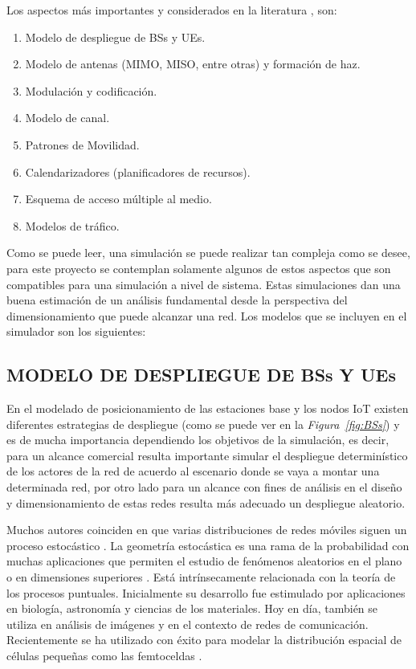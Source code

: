Los aspectos más importantes y considerados en la literatura \parencite{WirelessSim}, son:

\begin{enumerate}
    \item  Modelo de despliegue de BSs y UEs.
    \item  Modelo de antenas (MIMO, MISO, entre otras) y formación de haz.
    \item  Modulación y codificación.
    \item  Modelo de canal.
    \item  Patrones de Movilidad.
    \item  Calendarizadores (planificadores de recursos).
    \item  Esquema de acceso múltiple al medio.
    \item  Modelos de tráfico.
\end{enumerate}

Como se puede leer, una simulación se puede realizar tan compleja como se desee, para este proyecto se contemplan solamente algunos de estos aspectos que son compatibles para una simulación a nivel de sistema. Estas simulaciones dan una buena estimación de un análisis fundamental desde la perspectiva del dimensionamiento que puede alcanzar una red.\newline
Los modelos que se incluyen en el simulador son los siguientes:

\subsection{MODELO DE DESPLIEGUE DE BSs Y UEs}

En el modelado de posicionamiento de las estaciones base y los nodos IoT existen diferentes estrategias de despliegue (como se puede ver en la \textit{Figura~\ref{fig:BSs}}) y es de mucha importancia dependiendo los objetivos de la simulación, es decir, para un alcance comercial resulta importante simular el despliegue determinístico de los actores de la red de acuerdo al escenario donde se vaya a montar una determinada red, por otro lado para un alcance con fines de análisis en el diseño y dimensionamiento de estas redes resulta más adecuado un despliegue aleatorio. \newline

Muchos autores coinciden en que varias distribuciones de redes móviles siguen un proceso estocástico \parencite{Kouzayha2018}\parencite{Zhang2017}. La geometría estocástica es una rama de la probabilidad con muchas aplicaciones que permiten el estudio de fenómenos aleatorios en el plano o en dimensiones superiores \parencite{Haenggi2009}. Está intrínsecamente relacionada con la teoría de los procesos puntuales. Inicialmente su desarrollo fue estimulado por aplicaciones en biología, astronomía y ciencias de los materiales. Hoy en día, también se utiliza en análisis de imágenes y en el contexto de redes de comunicación. Recientemente se ha utilizado con éxito para modelar la distribución espacial de células pequeñas como las femtoceldas \parencite{TurjmanSmallCells}. \newline

